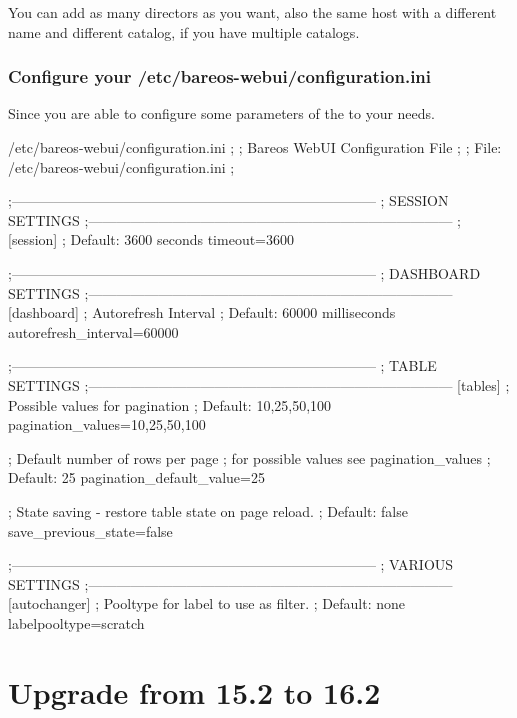 You can add as many directors as you want, also the same host with a different name and different catalog, if you have multiple catalogs.

\subsubsection{Configure your /etc/bareos-webui/configuration.ini}

Since 
you are able to configure some parameters of the \bareosWebui to your needs.

\begin{bconfig}{/etc/bareos-webui/configuration.ini}
;
; Bareos WebUI Configuration File
;
; File: /etc/bareos-webui/configuration.ini
;

;------------------------------------------------------------------------------
; SESSION SETTINGS
;------------------------------------------------------------------------------
;
[session]
; Default: 3600 seconds
timeout=3600

;------------------------------------------------------------------------------
; DASHBOARD SETTINGS
;------------------------------------------------------------------------------
[dashboard]
; Autorefresh Interval
; Default: 60000 milliseconds
autorefresh_interval=60000

;------------------------------------------------------------------------------
; TABLE SETTINGS
;------------------------------------------------------------------------------
[tables]
; Possible values for pagination
; Default: 10,25,50,100
pagination_values=10,25,50,100

; Default number of rows per page
; for possible values see pagination_values
; Default: 25
pagination_default_value=25

; State saving - restore table state on page reload.
; Default: false
save_previous_state=false

;------------------------------------------------------------------------------
; VARIOUS SETTINGS
;------------------------------------------------------------------------------
[autochanger]
; Pooltype for label to use as filter.
; Default: none
labelpooltype=scratch

\end{bconfig}

\section{Upgrade from 15.2 to 16.2}

